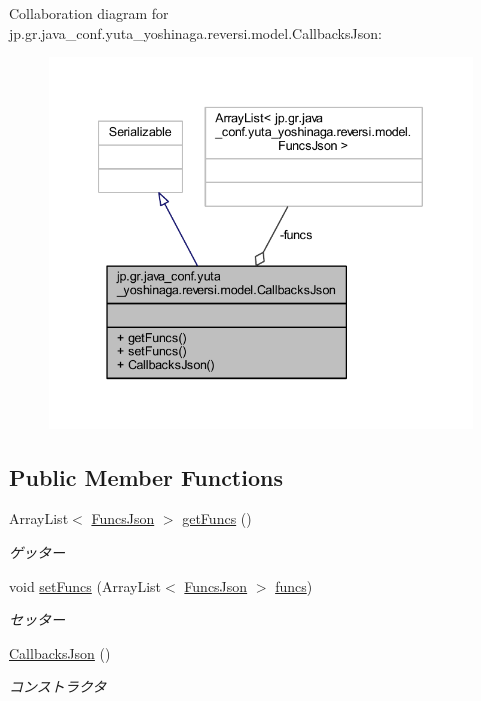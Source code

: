 Collaboration diagram for jp.\+gr.\+java\+\_\+conf.\+yuta\+\_\+yoshinaga.\+reversi.\+model.\+Callbacks\+Json\+:\nopagebreak
\begin{figure}[H]
\begin{center}
\leavevmode
\includegraphics[width=340pt]{classjp_1_1gr_1_1java__conf_1_1yuta__yoshinaga_1_1reversi_1_1model_1_1_callbacks_json__coll__graph}
\end{center}
\end{figure}
\subsection*{Public Member Functions}
\begin{DoxyCompactItemize}
\item 
Array\+List$<$ \hyperlink{classjp_1_1gr_1_1java__conf_1_1yuta__yoshinaga_1_1reversi_1_1model_1_1_funcs_json}{Funcs\+Json} $>$ \hyperlink{classjp_1_1gr_1_1java__conf_1_1yuta__yoshinaga_1_1reversi_1_1model_1_1_callbacks_json_af9a62a3dbe6416793c01d7a0f69da2b1}{get\+Funcs} ()
\begin{DoxyCompactList}\small\item\em ゲッター \end{DoxyCompactList}\item 
void \hyperlink{classjp_1_1gr_1_1java__conf_1_1yuta__yoshinaga_1_1reversi_1_1model_1_1_callbacks_json_a6de1fc00c131167b4fe6231a660bdb6e}{set\+Funcs} (Array\+List$<$ \hyperlink{classjp_1_1gr_1_1java__conf_1_1yuta__yoshinaga_1_1reversi_1_1model_1_1_funcs_json}{Funcs\+Json} $>$ \hyperlink{classjp_1_1gr_1_1java__conf_1_1yuta__yoshinaga_1_1reversi_1_1model_1_1_callbacks_json_acbc23906e4e1cd6ff59a46ee2d7e1a85}{funcs})
\begin{DoxyCompactList}\small\item\em セッター \end{DoxyCompactList}\item 
\hyperlink{classjp_1_1gr_1_1java__conf_1_1yuta__yoshinaga_1_1reversi_1_1model_1_1_callbacks_json_acdc36faba755660c46ab3d1641d18e67}{Callbacks\+Json} ()
\begin{DoxyCompactList}\small\item\em コンストラクタ \end{DoxyCompactList}\end{DoxyCompactItemize}

